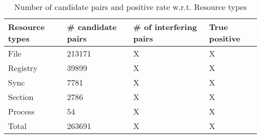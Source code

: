 
\begin{table}[htsb]
  \caption[Number of candidate pairs and positive rate w.r.t. Resource types]{Number of candidate pairs and positive rate w.r.t. Resource types}\label{tab:routers}
  \centering
  \begin{tabular}{l l l l}
    \toprule
    Resource types & \# candidate pairs& \# of interfering pairs & True positive \\
    \midrule
    File & 213171 & X & X \\
    Registry & 39899 & X & X \\
    Sync & 7781 & X & X \\
    Section & 2786 & X & X \\
    Process & 54 & X & X \\
    \bottomrule
    Total & 263691 & X & X \\
  \end{tabular}
\end{table}

